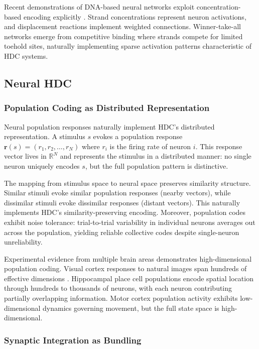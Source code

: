 \documentclass[12pt]{article}
\begin{document}
Recent demonstrations of DNA-based neural networks exploit concentration-based encoding explicitly \citep{Cherry2018}. Strand concentrations represent neuron activations, and displacement reactions implement weighted connections. Winner-take-all networks emerge from competitive binding where strands compete for limited toehold sites, naturally implementing sparse activation patterns characteristic of HDC systems.

\subsection{Neural HDC}

\subsubsection{Population Coding as Distributed Representation}

Neural population responses naturally implement HDC's distributed representation. A stimulus $s$ evokes a population response $\mathbf{r}(s) = (r_1, r_2, \ldots, r_N)$ where $r_i$ is the firing rate of neuron $i$. This response vector lives in $\mathbb{R}^N$ and represents the stimulus in a distributed manner: no single neuron uniquely encodes $s$, but the full population pattern is distinctive.

The mapping from stimulus space to neural space preserves similarity structure. Similar stimuli evoke similar population responses (nearby vectors), while dissimilar stimuli evoke dissimilar responses (distant vectors). This naturally implements HDC's similarity-preserving encoding. Moreover, population codes exhibit noise tolerance: trial-to-trial variability in individual neurons averages out across the population, yielding reliable collective codes despite single-neuron unreliability.

Experimental evidence from multiple brain areas demonstrates high-dimensional population coding. Visual cortex responses to natural images span hundreds of effective dimensions \citep{Stringer2019}. Hippocampal place cell populations encode spatial location through hundreds to thousands of neurons, with each neuron contributing partially overlapping information. Motor cortex population activity exhibits low-dimensional dynamics governing movement, but the full state space is high-dimensional.

\subsubsection{Synaptic Integration as Bundling}
\end{document}
